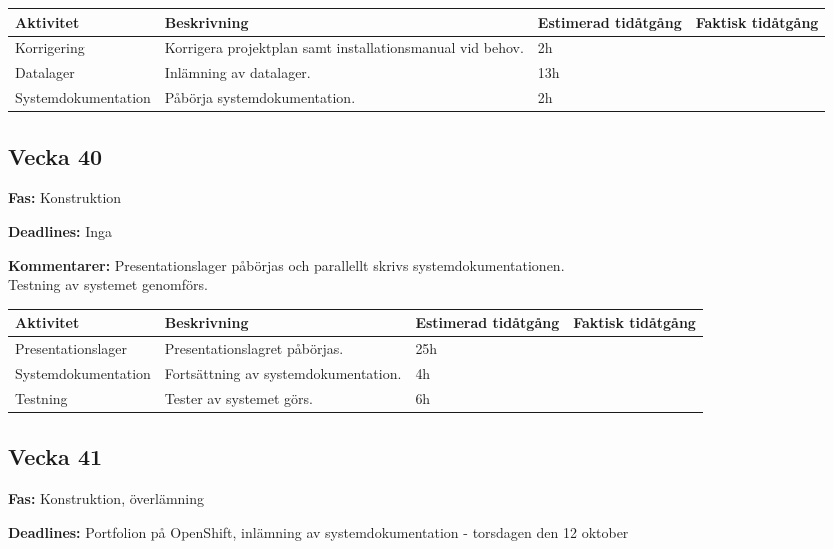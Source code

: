 \documentclass{TDP003mall}
\begin{document}
\begin{table}[H]
\renewcommand{\arraystretch}{1.5}
\begin{tabularx}{\linewidth}{|l|X|l|l|}
\hline
\textbf{Aktivitet} & \textbf{Beskrivning} & \textbf{Estimerad tidåtgång} & \textbf{Faktisk tidåtgång}\\
\hline
Korrigering & Korrigera projektplan samt installationsmanual vid behov.  & 2h  & \\
\hline
Datalager & Inlämning av datalager.  & 13h  & \\
\hline
Systemdokumentation & Påbörja systemdokumentation.  &  2h  &   \\
\hline

\end{tabularx}
\end{table}

\subsection{Vecka 40}

\textbf{Fas:} Konstruktion

\textbf{Deadlines:} Inga

\textbf{Kommentarer:} Presentationslager påbörjas och parallellt skrivs systemdokumentationen. \\
Testning av systemet genomförs.

\begin{table}[H]
\renewcommand{\arraystretch}{1.5}
\begin{tabularx}{\linewidth}{|l|X|l|l|}
\hline
\textbf{Aktivitet} & \textbf{Beskrivning} & \textbf{Estimerad tidåtgång} & \textbf{Faktisk tidåtgång}\\
\hline
Presentationslager & Presentationslagret påbörjas. & 25h & \\
\hline
Systemdokumentation & Fortsättning av systemdokumentation. & 4h & \\
\hline
Testning & Tester av systemet görs. & 6h & \\
\hline

\end{tabularx}
\end{table}

\subsection{Vecka 41}

\textbf{Fas:} Konstruktion, överlämning

\textbf{Deadlines:} Portfolion på OpenShift, inlämning av systemdokumentation - torsdagen den 12 oktober
\end{document}
